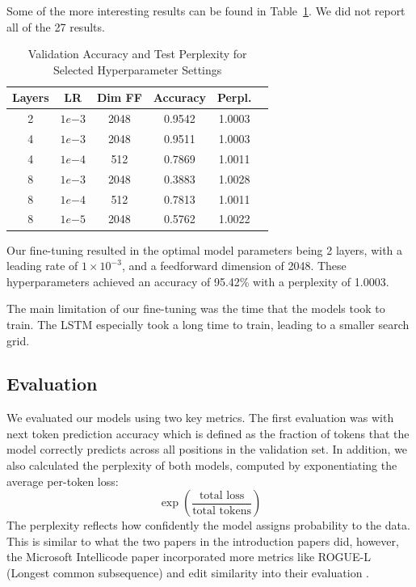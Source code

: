 \documentclass[11pt]{article}
\begin{document}
Some of the more interesting results can be found in Table~\ref{tab:tab3}. We did not report all of the 27 results.

\begin{table}[ht]
    \centering
    \begin{tabular}{|c|c|c|c|c|c|}
    \hline
    \textbf{Layers} & \textbf{LR} & \textbf{Dim FF} & \textbf{Accuracy} & \textbf{Perpl.} \\
    \hline
 2 & $1 e{-3}$ & 2048 & 0.9542 & 1.0003 \\
 4 & $1 e{-3}$ & 2048 & 0.9511 & 1.0003 \\
 4 & $1 e{-4}$ & 512  & 0.7869 & 1.0011 \\
 8 & $1 e{-3}$ & 2048 & 0.3883 & 1.0028 \\
 8 & $1 e{-4}$ & 512  & 0.7813 & 1.0011 \\
 8 & $1 e{-5}$ & 2048 & 0.5762 & 1.0022 \\
    \hline
    \end{tabular}
    \caption{Validation Accuracy and Test Perplexity for Selected Hyperparameter Settings}
    \label{tab:tab3}
\end{table}
    
Our fine-tuning resulted in the optimal model parameters being 2 layers, with a leading rate of \(1\times10^{-3}\), and a feedforward dimension of 2048. These hyperparameters achieved an accuracy of 95.42\% with a perplexity of 1.0003.

The main limitation of our fine-tuning was the time that the models took to train. The LSTM especially took a long time to train, leading to a smaller search grid.


\subsection{Evaluation}
We evaluated our models using two key metrics. The first evaluation was with next token prediction accuracy which is defined as the fraction of tokens that the model correctly predicts across all positions in the validation set. In addition, we also calculated the perplexity of both models, computed by exponentiating the average per-token loss:
\[
\exp\left(\frac{\text{total loss}}{\text{total tokens}}\right)
\]
The perplexity reflects how confidently the model assigns probability to the data. This is similar to what the two papers in the introduction papers did, however, the Microsoft Intellicode paper incorporated more metrics like ROGUE-L (Longest common subsequence) and edit similarity into their evaluation \cite{microsoft}.
\end{document}
